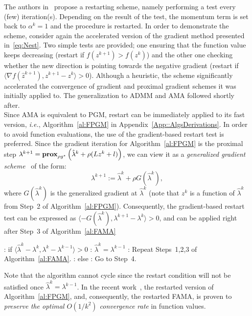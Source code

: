 \documentclass[openany]{now}
\newcommand{\ie}{{\it i.e.}}
\newcommand{\prox}{\mathop{\bf prox}}
\begin{document}
The authors in~\cite{adarestart} propose a restarting scheme, namely performing a test every (few) iteration(s). Depending on the result of the test, the momentum term is set back to $\alpha^k=1$ and the procedure is restarted. 
In order to demonstrate the scheme, consider again the accelerated version of the gradient method presented in~\eqref{eq:Nest}.
Two simple tests are provided; one ensuring that the function value keeps decreasing (restart if $f(z^{k+1})>f(z^k)$) and the other one checking whether the new direction is pointing towards the negative gradient (restart if $\langle\nabla f(\hat{z}^{k+1}),z^{k+1}-z^k\rangle>0$).
Although a heuristic, the scheme significantly accelerated the convergence of gradient and proximal gradient schemes it was initially applied to. The generalization to ADMM and AMA followed shortly after.\\

Since AMA is equivalent to PGM, restart can be immediately applied to its fast version, \ie, Algorithm~\ref{al:FPGM} in Appendix~\ref{App::AlgsDerivations}. In order to avoid function evaluations, the use of the gradient-based restart test is preferred. Since the gradient iteration for Algorithm~\ref{al:FPGM} is the proximal step $\lambda^{k+1} = \prox_{\rho g^\star}\left(\hat{\lambda}^k+\rho(Lz^{k}+l)\right)$, we can view it as a \emph{generalized gradient scheme}~\cite{adarestart} of the form:
\[
 \lambda^{k+1} := \hat{\lambda}^k+\rho G(\hat{\lambda}^k),
\]
where $G(\hat{\lambda}^k)$ is the generalized gradient at $\hat{\lambda}^k$ (note that $z^{k}$ is a function of $\hat{\lambda}^k$ from Step~2 of Algorithm~\ref{al:FPGM}). Consequently, the gradient-based restart test can be expressed as $\langle -G(\hat{\lambda}^k),\lambda^{k+1}-\lambda^{k}\rangle>0$, and can be applied right after Step~3 of Algorithm~\ref{al:FAMA}

\begin{algorithm}
\begin{algorithmic} 
: if $\langle \hat{\lambda}^{k}-\lambda^{k},\lambda^{k}-\lambda^{k-1}\rangle>0$
: \quad $\hat{\lambda}^k = \lambda^{k-1}$
: \quad Repeat Steps~1,2,3 of Algorithm~\ref{al:FAMA}.
: else
: \quad Go to Step~4.
\end{algorithmic}
\end{algorithm}\begin{footnotesize}
\end{footnotesize}
Note that the algorithm cannot cycle since the restart condition will not be satisfied once $\hat{\lambda}^k = \lambda^{k-1}$. In the recent work~\cite{7040179}, the restarted version of Algorithm~\ref{al:FPGM}, and, consequently, the restarted FAMA, is proven to \emph{preserve the optimal $O(1/k^2)$ convergence rate} in function values.
\\
\end{document}
